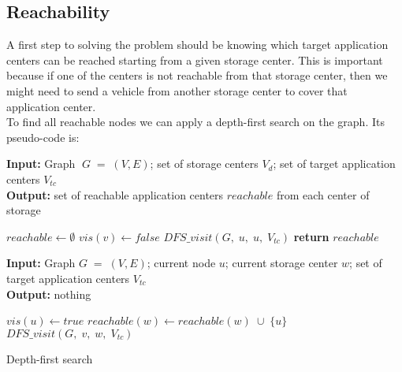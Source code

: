 \documentclass{article}
\begin{document}
\subsection{Reachability}
A first step to solving the problem should be knowing which target application centers can be reached starting from a given storage center. This is important because if one of the centers is not reachable from that storage center, then we might need to send a vehicle from another storage center to cover that application center.\\
To find all reachable nodes we can apply a depth-first search on the graph. Its pseudo-code is:
\begin{algorithm}
\begin{minipage}[t]{0.48\textwidth}
\textbf{Input:} Graph $\;G\;=\;(V, E)$; set of storage centers $V_d$; set of target application centers $V_{tc}$\\
\textbf{Output:} set of reachable application centers $reachable$ from each center of storage
\begin{algorithmic}[1]
            \State $reachable \gets \emptyset$
                \State $vis(v) \gets false$
            \EndFor
            \State $DFS\_visit(G,\; u,\; u,\;V_{tc})$
        \EndFor
    \State \textbf{return} $reachable$
    \EndFunction
\end{algorithmic}
\end{minipage}
\hfill
\begin{minipage}[t]{0.48\textwidth}
\textbf{Input:} Graph $G\;=\;(V, E)$; current node $u$; current storage center $w$; set of target application centers $V_{tc}$\\
\textbf{Output:} nothing
\begin{algorithmic}[1]
        \State $vis(u) \gets true$
            \State $reachable(w) \gets reachable(w) \; \cup \; \{u\}$
        \EndIf
            \State $DFS\_visit(G,\; v,\;w,\; V_{tc})$
            \EndIf
        \EndFor
    \EndFunction
\end{algorithmic}
\end{minipage}
\caption{Depth-first search}
\end{algorithm}
\end{document}
